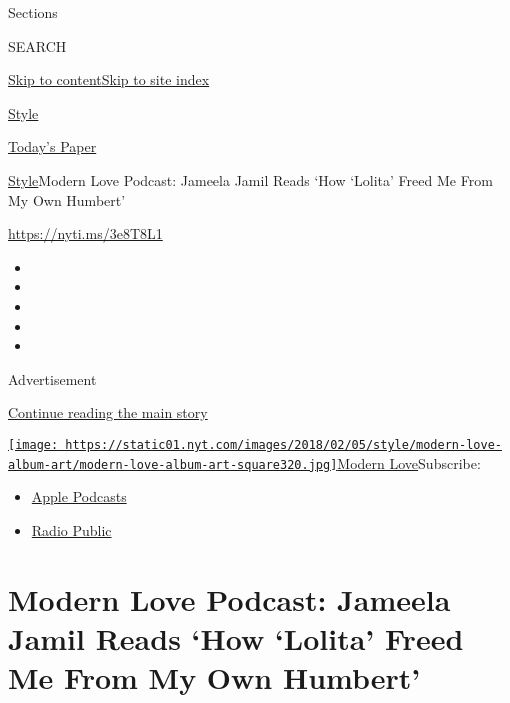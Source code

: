 Sections

SEARCH

\protect\hyperlink{site-content}{Skip to
content}\protect\hyperlink{site-index}{Skip to site index}

\href{https://www.nytimes.com/section/style}{Style}

\href{https://myaccount.nytimes.com/auth/login?response_type=cookie\&client_id=vi}{}

\href{https://www.nytimes.com/section/todayspaper}{Today's Paper}

\href{/section/style}{Style}\textbar{}Modern Love Podcast: Jameela Jamil
Reads `How `Lolita' Freed Me From My Own Humbert'

\url{https://nyti.ms/3e8T8L1}

\begin{itemize}
\item
\item
\item
\item
\item
\end{itemize}

Advertisement

\protect\hyperlink{after-top}{Continue reading the main story}

\href{https://www.nytimes.com/column/modern-love-podcast}{\texttt{[image: https://static01.nyt.com/images/2018/02/05/style/modern-love-album-art/modern-love-album-art-square320.jpg]}Modern
Love}Subscribe:

\begin{itemize}
\tightlist
\item
  \href{https://itunes.apple.com/us/podcast/id1065559535}{Apple
  Podcasts}
\item
  \href{https://play.radiopublic.com/modern-love-k6pYB8}{Radio Public}
\end{itemize}

\hypertarget{modern-love-podcast-jameela-jamil-reads-how-lolita-freed-me-from-my-own-humbert}{%
\section{Modern Love Podcast: Jameela Jamil Reads `How `Lolita' Freed Me
From My Own
Humbert'}\label{modern-love-podcast-jameela-jamil-reads-how-lolita-freed-me-from-my-own-humbert}}

\subsection{}

